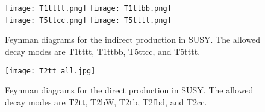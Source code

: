 \begin{figure}[!htb]
	\begin{center}
		\texttt{[image: T1tttt.png]}
		\texttt{[image: T1ttbb.png]} \\
		\texttt{[image: T5ttcc.png]}
		\texttt{[image: T5tttt.png]} \\
	\end{center}
	\caption{Feynman diagrams for the indirect \st{} production in SUSY. The allowed decay modes are T1tttt, T1ttbb, T5ttcc, and T5tttt.
	}
	\label{fig:stop-gluino-production}
\end{figure}

\begin{figure}[!htb]
	\begin{center}
		\texttt{[image: T2tt\_all.jpg]}
	\end{center}
	\caption{Feynman diagrams for the direct \st{} production in SUSY. The allowed decay modes are T2tt, T2bW, T2tb, T2fbd, and T2cc. }
	\label{fig:stop-direct-production}
\end{figure}